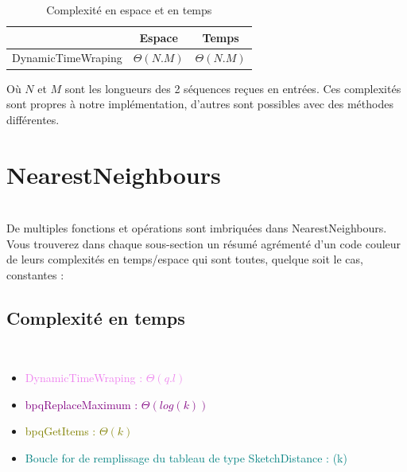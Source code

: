 \documentclass[a4paper, 11pt]{article}
\begin{document}
\begin{table}[H]
    \centering
    \begin{tabular}{|c|c|c|}
    \hline
                        & Espace                  & Temps            \\
    \hline   
    
    DynamicTimeWraping   & $\Theta(N.M)$       & $\Theta(N.M)$    \\
    \hline
    \end{tabular}
    \caption{Complexité en espace et en temps}
    \label{tab:complexity1}
\end{table}

Où $N$ et $M$ sont les longueurs des 2 séquences reçues en entrées. Ces complexités sont propres à notre implémentation, d'autres sont possibles avec des méthodes différentes.

\section{NearestNeighbours}\\
De multiples fonctions et opérations sont imbriquées dans NearestNeighbours. Vous trouverez dans chaque sous-section un résumé agrémenté d'un code couleur de leurs complexités en temps/espace qui sont toutes, quelque soit le cas, constantes :

\subsection{\textbf{Complexité en temps}}\\
    
    \begin{itemize}
    
    \item \textcolor{violet}{DynamicTimeWraping :  $\Theta(q.l)$}\\
    
    \item \textcolor{purple}{bpqReplaceMaximum : $\Theta(log(k))$}\\
    
    \item \textcolor{olive}{bpqGetItems : $\Theta(k)$}\\
    
    \item \textcolor{teal}{Boucle for de remplissage du tableau de type SketchDistance : \Theta(k)}\\
    
    \end{itemize}
    
\end{document}
